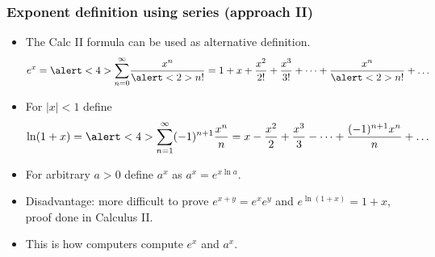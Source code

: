 \begin{frame}
\frametitle{Exponent definition using series (approach II)}
\begin{itemize}
\item<1-> The Calc II formula can be used as alternative definition.
\[
e^{x}=\alert<4>{\sum_{n=0}^{\infty}} \frac{x^n}{\alert<2>{n!}}= 1+ x+\frac{x^2}{2!}+\frac{x^3}{3!}+\dots + \frac{x^{n}}{\alert<2>{n!}}+\dots
\]
\item<3-> For $|x|<1$ define 
\[
\ln (1+x)=\alert<4>{\sum_{n=1}^{\infty}} (-1)^{n+1}\frac{x^n}{n}=  x-\frac{x^2}{2}+\frac{x^3}{3}-\dots + \frac{(-1)^{n+1}x^{n}}{n}+\dots
\]
\item<5-> For arbitrary $a>0$ define $a^x$ as $a^x=e^{x\ln a}$. 
\item<6-> Disadvantage: more difficult to prove $e^{x+y}=e^{x}e^y$ and $e^{\ln(1+x)}=1+x$, proof done in Calculus II.
\item<7-> This is how computers compute $e^x$ and $a^x$.
\end{itemize}
\end{frame}

